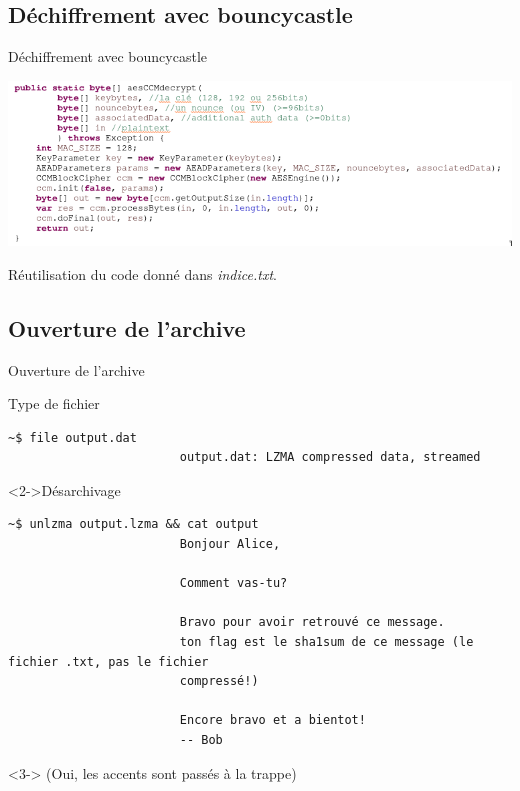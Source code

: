 \documentclass[10pt,sans,usenames,dvipsnames,french,compress]{beamer}
\begin{document}
\subsection{Déchiffrement avec bouncycastle}
\begin{frame}[fragile]{Déchiffrement avec bouncycastle}
	\begin{center}
		\includegraphics[width=0.95\linewidth]{120/eclipse.png}
	\end{center}
    Réutilisation du code donné dans \textit{indice.txt}.


\end{frame}

\subsection{Ouverture de l'archive}
\begin{frame}[fragile]{Ouverture de l'archive}
  \begin{block}{Type de fichier}
    \vspace{-3mm}
    \begin{lstlisting}[style=Term]
                        ~$ file output.dat
                        output.dat: LZMA compressed data, streamed
    \end{lstlisting}
    \vspace{-2mm}
  \end{block}
  \begin{block}<2->{Désarchivage}
    \vspace{-3mm}
    \begin{lstlisting}[style=Term]
                        ~$ unlzma output.lzma && cat output
                        Bonjour Alice,

                        Comment vas-tu?

                        Bravo pour avoir retrouvé ce message.
                        ton flag est le sha1sum de ce message (le fichier .txt, pas le fichier
                        compressé!)

                        Encore bravo et a bientot!
                        -- Bob
    \end{lstlisting}
    \vspace{-2mm}
  \end{block}
  \begin{block}<3->{}
    (Oui, les accents sont passés à la trappe)
  \end{block}
\end{frame}
\end{document}
